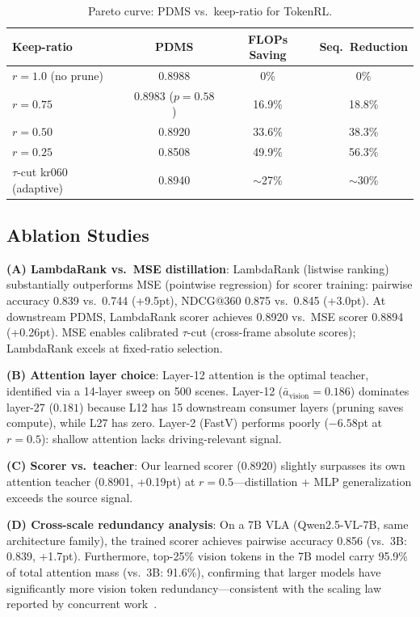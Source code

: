 \documentclass[letterpaper]{article} %
\newcommand{\ours}{TokenRL}
\begin{document}
\begin{table}[t]
\centering
\caption{Pareto curve: PDMS vs.\ keep-ratio for \ours{}.}
\label{tab:pareto}
\small
\begin{tabular}{lccc}
\toprule
\textbf{Keep-ratio} & \textbf{PDMS} & \textbf{FLOPs Saving} & \textbf{Seq.\ Reduction} \\
\midrule
$r=1.0$ (no prune) & 0.8988 & 0\% & 0\% \\
$r=0.75$ & 0.8983 ($p{=}0.58$) & 16.9\% & 18.8\% \\
$r=0.50$ & 0.8920 & 33.6\% & 38.3\% \\
$r=0.25$ & 0.8508 & 49.9\% & 56.3\% \\
$\tau$-cut kr060 (adaptive) & 0.8940 & ${\sim}$27\% & ${\sim}$30\% \\
\bottomrule
\end{tabular}
\end{table}

\subsection{Ablation Studies}
\label{sec:exp_ablation}

\textbf{(A) LambdaRank vs.\ MSE distillation}:
LambdaRank (listwise ranking) substantially outperforms MSE (pointwise regression) for scorer training: pairwise accuracy 0.839 vs.\ 0.744 (+9.5pt), NDCG@360 0.875 vs.\ 0.845 (+3.0pt).
At downstream PDMS, LambdaRank scorer achieves 0.8920 vs.\ MSE scorer 0.8894 (+0.26pt).
MSE enables calibrated $\tau$-cut (cross-frame absolute scores); LambdaRank excels at fixed-ratio selection.

\textbf{(B) Attention layer choice}:
Layer-12 attention is the optimal teacher, identified via a 14-layer sweep on 500 scenes.
Layer-12 ($\bar{a}_\text{vision}{=}0.186$) dominates layer-27 ($0.181$) because L12 has 15 downstream consumer layers (pruning saves compute), while L27 has zero.
Layer-2 (FastV) performs poorly ($-6.58$pt at $r{=}0.5$): shallow attention lacks driving-relevant signal.

\textbf{(C) Scorer vs.\ teacher}:
Our learned scorer (0.8920) slightly surpasses its own attention teacher (0.8901, +0.19pt) at $r{=}0.5$---distillation + MLP generalization exceeds the source signal.

\textbf{(D) Cross-scale redundancy analysis}:
On a 7B VLA (Qwen2.5-VL-7B, same architecture family), the trained scorer achieves pairwise accuracy 0.856 (vs.\ 3B: 0.839, +1.7pt).
Furthermore, top-25\% vision tokens in the 7B model carry 95.9\% of total attention mass (vs.\ 3B: 91.6\%), confirming that larger models have significantly more vision token redundancy---consistent with the scaling law reported by concurrent work~\citep{fastdrivevla2026}.
\end{document}
